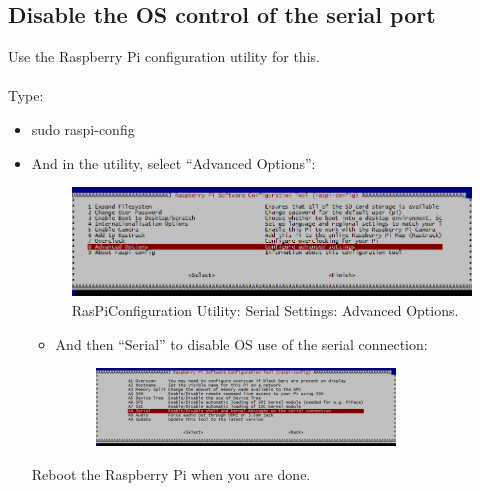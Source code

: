 \documentclass[11pt,a4paper]{article}
\begin{document}
	 \subsection{Disable the OS control of the serial port}
	 Use the Raspberry Pi configuration utility for this.
		\paragraph{}Type:
			\begin{itemize}
				\item sudo raspi-config
				\item And in the utility, select 								“Advanced Options”:
				\begin{figure}[H]
	 	\centering
		\includegraphics[scale=0.37]{adv1}
	 	\caption{RasPiConfiguration Utility: Serial Settings: Advanced Options.}
\end{figure}
		\begin{itemize}
			\item And then “Serial” to disable OS use of the serial connection:
			\begin{figure}[H]
	 	\centering
		\includegraphics[scale=0.85]{adv2}
\end{figure}
		\end{itemize}
Reboot the Raspberry Pi when you are done.
			\end{itemize}
\end{document}
